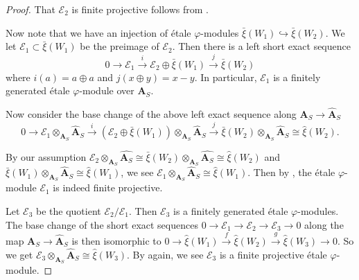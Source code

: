 \documentclass[10pt]{article}
\numberwithin{equation}{section}
\newcommand{\calE}{{\mathcal E}}
\newcommand{\bfA}{{\textbf{A}}}
\begin{document}
\begin{proof}
That $\calE_2$ is finite projective follows from \cite[Theorem 5.5.20]{EG21}.

Now note that we have an injection of \'etale $\varphi$-modules $\bar\xi(W_1)\hookrightarrow\bar\xi(W_2)$. We let $\calE_1\subset \bar\xi(W_1)$ be the preimage of $\calE_2$. Then there is a left short exact sequence
\[
0\to \calE_1\xrightarrow{i} \calE_2\oplus \bar\xi(W_1)\xrightarrow{j} \bar\xi(W_2)
\]
where $i(a)=a\oplus a$ and $j(x\oplus y)=x-y$. In particular, $\calE_1$ is a finitely generated \'etale $\varphi$-module over $\bfA_S$. 

Now consider the base change of the above left exact sequence along $\bfA_S\to \widehat\bfA_S$
\[
0\to \calE_1\otimes_{\bfA_S}\widehat\bfA_S\xrightarrow{i} (\calE_2\oplus \bar\xi(W_1))\otimes_{\bfA_S}\widehat\bfA_S\xrightarrow{j} \bar\xi(W_2)\otimes_{\bfA_S}\widehat\bfA_S\cong \widehat\xi(W_2).
\]

By our assumption $\calE_2\otimes_{\bfA_S}\widehat{\bfA_S}\cong \bar\xi(W_2)\otimes_{\bfA_S}\widehat{\bfA_S}\cong \widehat\xi(W_2)$ and $\bar\xi(W_1)\otimes_{\bfA_S}\widehat\bfA_S\cong \widehat\xi(W_1)$, we see $\calE_1\otimes_{\bfA_S}\widehat\bfA_S\cong \widehat\xi(W_1)$. Then by \cite[Theorem 5.5.20]{EG21}, the \'etale $\varphi$-module $\calE_1$ is indeed finite projective.

Let $\calE_3$ be the quotient $\calE_2/\calE_1$. Then $\calE_3$ is a finitely generated \'etale $\varphi$-modules. The base change of the short exact sequences $0\to \calE_1\to \calE_2\to \calE_3\to 0$ along the map $\bfA_S\to \widehat\bfA_S$ is then  isomorphic to $0\to \widehat\xi(W_1)\xrightarrow{f} \widehat\xi(W_2)\xrightarrow{g}\widehat\xi(W_3)\to 0$. So we get $\calE_3\otimes_{\bfA_S}\widehat\bfA_S\cong \widehat\xi(W_3)$. By \cite[Theorem 5.5.20]{EG21} again, we see $\calE_3$ is a finite projective \'etale $\varphi$-module. 
\end{proof}
\end{document}
